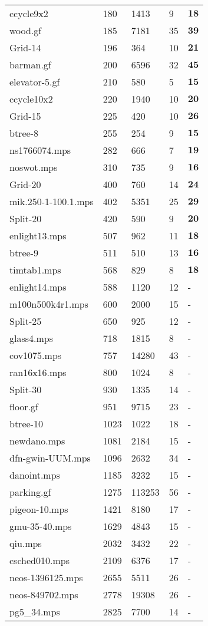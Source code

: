 \documentclass{article}
\begin{document}
\begin{longtable}{|l |l |l |l |l |}
ccycle9x2&180&1413&9&$\mathbf{18}$\\
wood.gf&185&7181&35&$\mathbf{39}$\\
Grid-14&196&364&10&$\mathbf{21}$\\
barman.gf&200&6596&32&$\mathbf{45}$\\
elevator-5.gf&210&580&5&$\mathbf{15}$\\
ccycle10x2&220&1940&10&$\mathbf{20}$\\
Grid-15&225&420&10&$\mathbf{26}$\\
btree-8&255&254&9&$\mathbf{15}$\\
ns1766074.mps&282&666&7&$\mathbf{19}$\\
noswot.mps&310&735&9&$\mathbf{16}$\\
Grid-20&400&760&14&$\mathbf{24}$\\
mik.250-1-100.1.mps&402&5351&25&$\mathbf{29}$\\
Split-20&420&590&9&$\mathbf{20}$\\
enlight13.mps&507&962&11&$\mathbf{18}$\\
btree-9&511&510&13&$\mathbf{16}$\\
timtab1.mps&568&829&8&$\mathbf{18}$\\
enlight14.mps&588&1120&12&-\\
m100n500k4r1.mps&600&2000&15&-\\
Split-25&650&925&12&-\\
glass4.mps&718&1815&8&-\\
cov1075.mps&757&14280&43&-\\
ran16x16.mps&800&1024&8&-\\
Split-30&930&1335&14&-\\
floor.gf&951&9715&23&-\\
btree-10&1023&1022&18&-\\
newdano.mps&1081&2184&15&-\\
dfn-gwin-UUM.mps&1096&2632&34&-\\
danoint.mps&1185&3232&15&-\\
parking.gf&1275&113253&56&-\\
pigeon-10.mps&1421&8180&17&-\\
gmu-35-40.mps&1629&4843&15&-\\
qiu.mps&2032&3432&22&-\\
csched010.mps&2109&6376&17&-\\
neos-1396125.mps&2655&5511&26&-\\
neos-849702.mps&2778&19308&26&-\\
pg5_34.mps&2825&7700&14&-\\

\end{longtable}
\end{document}

